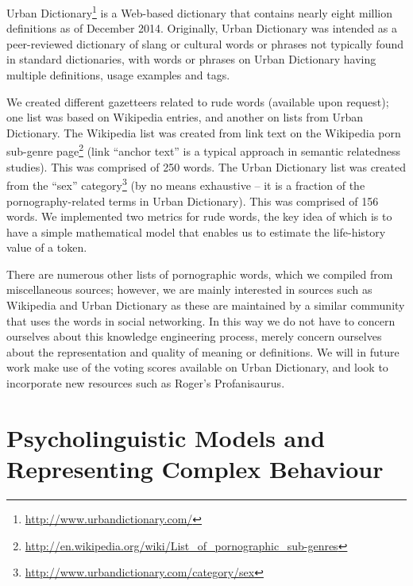 \documentclass{AISB2008}
\begin{document}
Urban Dictionary\footnote{\url{http://www.urbandictionary.com/}} is a
Web-based dictionary that contains nearly eight million definitions as
of December 2014. Originally, Urban Dictionary was intended as a
peer-reviewed dictionary of slang or cultural words or phrases not
typically found in standard dictionaries, with words or phrases on
Urban Dictionary having multiple definitions, usage examples and tags.


We created different gazetteers related to rude words (available upon
request); one list was based on Wikipedia entries, and another on
lists from Urban Dictionary. The Wikipedia list was created from link
text on the Wikipedia porn sub-genre
page\footnote{\url{http://en.wikipedia.org/wiki/List_of_pornographic_sub-genres}}
(link ``anchor text'' is a typical approach in semantic relatedness
studies). This was comprised of 250 words. The Urban Dictionary list
was created from the ``sex''
category\footnote{\url{http://www.urbandictionary.com/category/sex}}
(by no means exhaustive -- it is a fraction of the pornography-related
terms in Urban Dictionary). This was comprised of 156 words. We
implemented two metrics for rude words, the key idea of which is to
have a simple mathematical model that enables us to estimate the
life-history value of a token.

There are numerous other lists of pornographic words, which we
compiled from miscellaneous sources; however, we are mainly interested
in sources such as Wikipedia and Urban Dictionary as these are
maintained by a similar community that uses the words in social
networking. In this way we do not have to concern ourselves about this
knowledge engineering process, merely concern ourselves about the
representation and quality of meaning or definitions. We will in
future work make use of the voting scores available on Urban
Dictionary, and look to incorporate new resources such as Roger's
Profanisaurus.


\section{Psycholinguistic Models and Representing Complex Behaviour}
\end{document}
